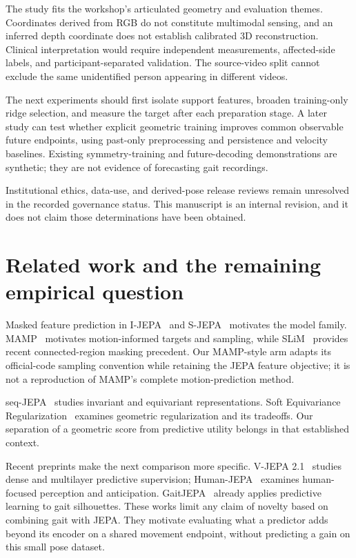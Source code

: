 \documentclass{article}
\begin{document}
The study fits the workshop's articulated geometry and evaluation themes. Coordinates derived from RGB do not constitute multimodal sensing, and an inferred depth coordinate does not establish calibrated 3D reconstruction. Clinical interpretation would require independent measurements, affected-side labels, and participant-separated validation. The source-video split cannot exclude the same unidentified person appearing in different videos.

The next experiments should first isolate support features, broaden training-only ridge selection, and measure the target after each preparation stage. A later study can test whether explicit geometric training improves common observable future endpoints, using past-only preprocessing and persistence and velocity baselines. Existing symmetry-training and future-decoding demonstrations are synthetic; they are not evidence of forecasting gait recordings.

Institutional ethics, data-use, and derived-pose release reviews remain unresolved in the recorded governance status. This manuscript is an internal revision, and it does not claim those determinations have been obtained.

\section{Related work and the remaining empirical question}\label{related-work-and-the-remaining-empirical-question}

Masked feature prediction in I-JEPA~\citep{ref07} and S-JEPA~\citep{ref08} motivates the model family. MAMP~\citep{ref09} motivates motion-informed targets and sampling, while SLiM~\citep{ref10} provides recent connected-region masking precedent. Our MAMP-style arm adapts its official-code sampling convention while retaining the JEPA feature objective; it is not a reproduction of MAMP's complete motion-prediction method.

seq-JEPA~\citep{ref11} studies invariant and equivariant representations. Soft Equivariance Regularization~\citep{ref12} examines geometric regularization and its tradeoffs. Our separation of a geometric score from predictive utility belongs in that established context.

Recent preprints make the next comparison more specific. V-JEPA 2.1~\citep{ref13} studies dense and multilayer predictive supervision; Human-JEPA~\citep{ref14} examines human-focused perception and anticipation. GaitJEPA~\citep{ref15} already applies predictive learning to gait silhouettes. These works limit any claim of novelty based on combining gait with JEPA. They motivate evaluating what a predictor adds beyond its encoder on a shared movement endpoint, without predicting a gain on this small pose dataset.
\end{document}
